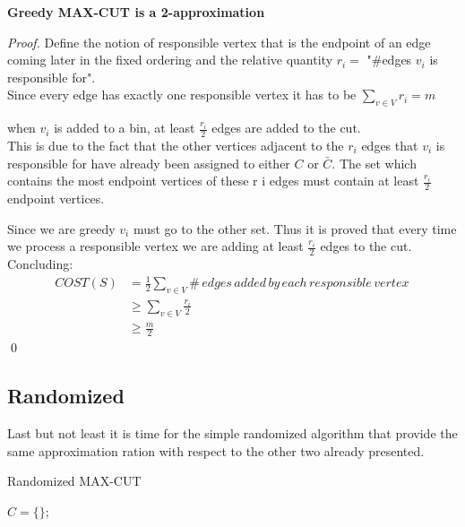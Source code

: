 \begin{theorem}{\textbf{Greedy MAX-CUT is a 2-approximation}}
\end{theorem}
\begin{proof}
  Define the notion of responsible vertex that is the endpoint of an edge coming later in the fixed ordering 
  and the relative quantity $r_i =$ "\#edges $v_i$ is responsible for".\\
  Since every edge has exactly one responsible vertex it has to be $\sum_{v \in V} r_i = m$
  \begin{claim}
  	when $ v_i $ is added to a bin, at least $ \frac{r_i}{2}$ edges are added to the cut.\\
  	This is due to the fact that the other vertices
  	adjacent to the $ r_i $ edges that $ v_i $ is responsible for have already been assigned to either $C$ or $ \bar{C} $. 
  	The set which contains the most endpoint vertices of these r i edges must contain at least $ \frac{r_i}{2} $ endpoint vertices.

  \end{claim}
  Since we are greedy $ v_i $ must go to the other set. Thus it is proved that every time we process a responsible vertex we are adding at least $ \frac{r_i}{2}$ edges to the cut. Concluding:
  \begin{align}
  	COST(S) & = \frac{1}{2} \sum_{v \in V} \#\, edges\,added\,by\,each \,responsible \,vertex\,\\ 
			& \geq \sum_{v \in V} \frac{r_i}{2}  \\
			& \geq \frac{m}{2}
\end{align}
  \qed
\end{proof}


\subsection{Randomized}
Last but not least it is time for the simple randomized algorithm that provide the same approximation ration with respect to the other two already presented.

\begin{algorithm}[H]
	\SetAlgoLined
	\caption{Randomized MAX-CUT}
	$C =\{\}$;\\
\end{algorithm}
\bigskip

